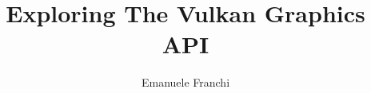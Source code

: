 \documentclass[a4paper]{report}
\author{Emanuele Franchi}
\title{Exploring The Vulkan Graphics API}
\begin{document}







\tableofcontents
\listoffigures
\lstlistoflistings














\appendix




\nocite{*}

\end{document}
